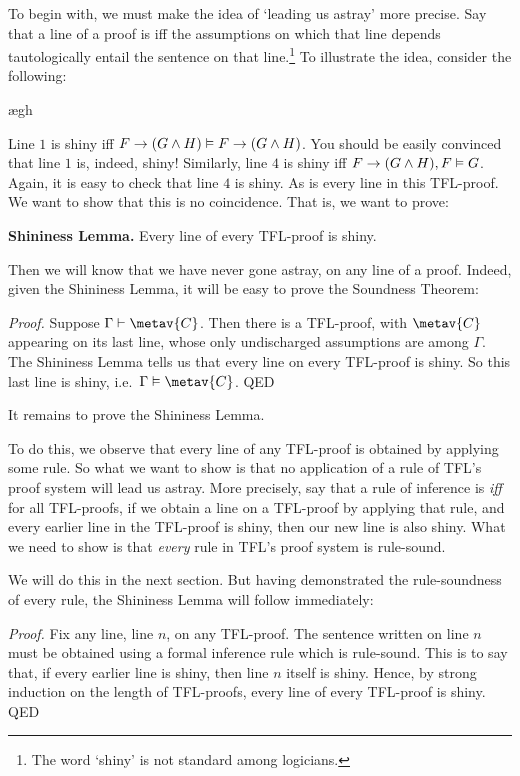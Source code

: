 To begin with, we must make the idea of `leading us astray' more precise. Say that a line of a proof is  iff the assumptions on which that line depends tautologically entail the sentence on that line.\footnote{The word `shiny' is not standard among logicians.} To illustrate the idea, consider the following:
	\begin{fitchproof}
		\open
			\ae{gh}
		\close
	\end{fitchproof}\noindent\noindent
Line $1$ is shiny iff $F \rightarrow (G \wedge H) \vDash F \rightarrow (G \wedge H)$. You should be easily convinced that line $1$ is, indeed, shiny! Similarly, line $4$ is shiny iff $F \rightarrow (G \wedge H), F \vDash G$. Again, it is easy to check that line $4$ is shiny. As is every line in this TFL-proof. We want to show that this is no coincidence. That is, we want to prove:
	\begin{factoidboxe}\textbf{Shininess Lemma.}
		Every line of every TFL-proof is shiny.
	\end{factoidboxe}\noindent
Then we will know that we have never gone astray, on any line of a proof. Indeed, given the Shininess Lemma, it will be easy to prove the Soundness Theorem:

\emph{Proof.} Suppose $\Gamma \proves \metav{C}$. Then there is a TFL-proof, with $\metav{C}$ appearing on its last line, whose only undischarged assumptions are among $\Gamma$. The Shininess Lemma tells us that every line on every TFL-proof is shiny. So this last line is shiny, i.e.\ $\Gamma \entails \metav{C}$. QED

It remains to prove the Shininess Lemma. 

To do this, we observe that every line of any TFL-proof is obtained by applying some rule. So what we want to show is that no application of a rule of TFL's proof system will lead us astray. More precisely, say that a rule of inference is  \emph{iff} for all TFL-proofs, if we obtain a line on a TFL-proof by applying that rule, and every earlier line in the TFL-proof is shiny, then our new line is also shiny. What we need to show is that \emph{every} rule in TFL's proof system is rule-sound. 

We will do this in the next section. But having demonstrated the rule-soundness of every rule, the Shininess Lemma will follow immediately:

\emph{Proof.} Fix any line, line $n$, on any TFL-proof. The sentence written on line $n$ must be obtained using a formal inference rule which is rule-sound. This is to say that, if every earlier line is shiny, then line $n$ itself is shiny. Hence, by strong induction on the length of TFL-proofs, every line of every TFL-proof is shiny. QED

